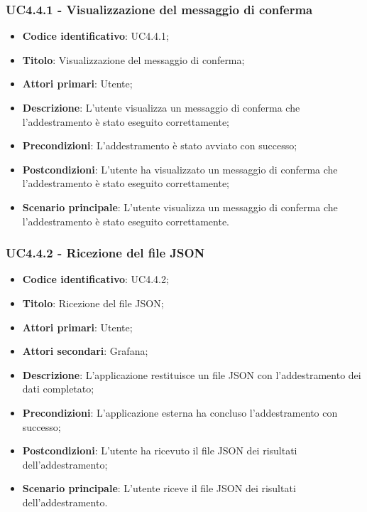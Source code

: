 \subsubsection{UC4.4.1 - Visualizzazione del messaggio di conferma}
\begin{itemize}
	\item \textbf{Codice identificativo}: UC4.4.1;
	\item \textbf{Titolo}: Visualizzazione del messaggio di conferma;
	\item \textbf{Attori primari}: Utente;
	\item \textbf{Descrizione}: L'utente visualizza un messaggio di conferma che l'addestramento è stato eseguito correttamente;
	\item \textbf{Precondizioni}: L'addestramento è stato avviato con successo;
	\item \textbf{Postcondizioni}: L'utente ha visualizzato un messaggio di conferma che l'addestramento è stato eseguito correttamente;
	\item \textbf{Scenario principale}: L'utente visualizza un messaggio di conferma che l'addestramento è stato eseguito correttamente.
\end{itemize}


\subsubsection{UC4.4.2 - Ricezione del file JSON}
\begin{itemize}
    \item \textbf{Codice identificativo}: UC4.4.2;
    \item \textbf{Titolo}: Ricezione del file JSON;
    \item \textbf{Attori primari}: Utente;
    \item \textbf{Attori secondari}: Grafana\glo;
    \item \textbf{Descrizione}: L'applicazione restituisce un file JSON con l'addestramento dei dati completato;
    \item \textbf{Precondizioni}: L'applicazione esterna ha concluso l'addestramento con successo;
    \item \textbf{Postcondizioni}: L'utente ha ricevuto il file JSON dei risultati dell'addestramento;
    \item \textbf{Scenario principale}: L'utente riceve il file JSON dei risultati dell'addestramento.
\end{itemize}